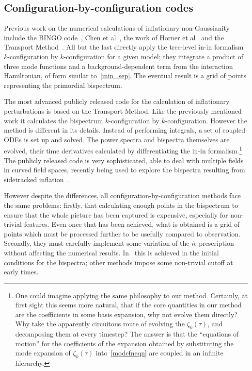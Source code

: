 \documentclass[a4paper,12pt]{extarticle}
\newcommand{\eps}{\epsilon}
\begin{document}
\subsection{Configuration-by-configuration codes}\label{sec:rev_config_codes}
Previous work on the numerical calculations of inflationary
non-Gaussianity include the BINGO code~\cite{BINGO},
Chen et al~\cite{chen_easther_lim_1,chen_easther_lim_2},
the work of Horner et al~\cite{horner_methods,horner_ng,horner_cs}
and the Transport Method~\cite{transport_main,transport_pytransport,transport_pytransport_2,transport_curved_3_point}.
All but the last directly apply the tree-level in-in formalism $k$-configuration by $k$-configuration for a given model;
they integrate a product of three mode functions and a background-dependent term from the interaction Hamiltonian, of form similar to~\eqref{inin_sep}.
The eventual result is a grid of points representing the primordial bispectrum.


The most advanced publicly released code for the calculation of inflationary perturbations
is based on the Transport Method.
Like the previously mentioned work it calculates the bispectrum $k$-configuration by $k$-configuration.
However the method is different in its details.
Instead of performing integrals,
a set of coupled ODEs is set up and solved.
The power spectra and bispectra themselves are evolved, their time derivatives calculated by differentiating the in-in formalism.\footnote{
    One could imagine applying the same philosophy to our method.
    Certainly, at first sight this seems more natural, that if the core
    quantities in our method are the coefficients in some basis expansion,
    why not evolve them directly? Why take the apparently circuitous route
    of evolving the $\zeta_k(\tau)$, and decomposing them at every timestep?
    The answer is that the ``equations of motion'' for the coefficients of the expansion
    obtained by substituting the mode expansion of $\zeta_k(\tau)$ into~\eqref{modefneqn}
    are coupled in an infinite hierarchy.
}
The publicly released code is very sophisticated,
able to deal with multiple fields in curved field spaces,
recently being used to explore the bispectra resulting from
sidetracked inflation~\cite{RP_1}.


However despite the differences, all configuration-by-configuration methods face the same problems:
firstly, that calculating enough points in the bispectrum to ensure that
the whole picture has been captured is expensive, especially for non-trivial features.
Even once that has been achieved, what is obtained is a grid of points
which must be processed further to be usefully compared to observation.
Secondly, they must carefully implement some variation
of the $i\eps$ prescription without affecting the numerical results.
In~\cite{transport_main} this is achieved in the initial conditions for the bispectra;
other methods impose some non-trivial cutoff at early times.
\end{document}
